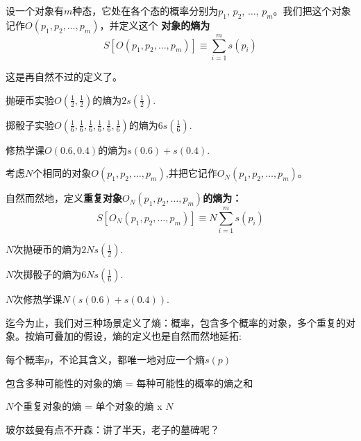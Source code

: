 \documentclass[CJK]{beamer}
\begin{document}
\begin{frame}
\bch
设一个对象有$m$种态，它处在各个态的概率分别为$p_1$, $p_2$, $\ldots$, $p_m$。我们把这个对象记作$O(p_1, p_2, \ldots, p_m)$，并定义这个{\bf \blue
对象的熵为
$$S\left[O(p_1, p_2, \ldots, p_m)\right] \equiv \sum_{i=1}^m  s(p_i)$$
}

这是再自然不过的定义了。

\skiplines

\bex
{\small 
抛硬币实验$O(\frac{1}{2},\frac{1}{2})$的熵为$2s(\frac{1}{2})$.

\skipline

掷骰子实验$O(\frac{1}{6},\frac{1}{6},\frac{1}{6},\frac{1}{6},\frac{1}{6},\frac{1}{6})$的熵为$6s(\frac{1}{6})$.

\skipline

修热学课$O(0.6, 0.4)$的熵为$s(0.6)+s(0.4)$.}

\eex
\ech
\end{frame}


\begin{frame}
\bch
{\small 考虑$N$个相同的对象$O(p_1, p_2, \ldots, p_m)$,并把它记作$O_N(p_1, p_2, \ldots, p_m)$。


自然而然地，定义{\blue \bf 重复对象$O_N(p_1, p_2, \ldots, p_m)$的熵为：
$$S\left[O_N(p_1, p_2, \ldots, p_m)\right] \equiv N \sum_{i=1}^m  s(p_i)$$
}}

\bex
{\small
$N$次抛硬币的熵为$2Ns(\frac{1}{2})$.

\skipline

$N$次掷骰子的熵为$6Ns(\frac{1}{6})$.

\skipline

$N$次修热学课$N\left(s(0.6)+s(0.4)\right)$.}

\eex

\ech
\end{frame}


\begin{frame}
\bch
迄今为止，我们对三种场景定义了熵：概率，包含多个概率的对象，多个重复的对象。按熵可叠加的假设，熵的定义也是自然而然地延拓:
\bitem
\item{每个概率$p$，不论其含义，都唯一地对应一个熵$s(p)$}
\item{包含多种可能性的对象的熵 = 每种可能性的概率的熵之和}
\item{$N$个重复对象的熵 = 单个对象的熵 x $N$}
\eitem

\skiplines

\emini
{}
玻尔兹曼有点不开森：讲了半天，老子的墓碑呢？
\emini

\ech
\end{frame}
\end{document}
